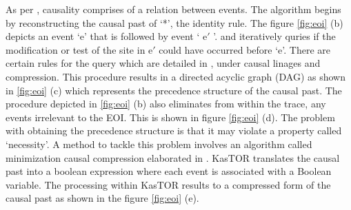 \documentclass[msc,deptreport,ai]{infthesis}      %
\begin{document}
As per \cite{kappaPlatform}, causality comprises of a relation between events. The algorithm begins by reconstructing the causal past of `*', the identity rule. The figure \ref{fig:eoi} (b) depicts an event `e' that is followed by event ` e$'$ '. and iteratively quries if the modification or test of the site in e$'$  could have occurred before `e'. There are certain rules for the query which are detailed in \cite{kappaPlatform}, under causal linages and compression. This procedure results in a directed acyclic graph (DAG) as shown in \ref{fig:eoi} (c) which represents the precedence structure of the causal past. The procedure depicted in \ref{fig:eoi} (b) also eliminates from within the trace, any events irrelevant to the EOI. This is shown in figure \ref{fig:eoi} (d). The problem with obtaining the precedence structure is that it may violate a property called `necessity'. A method to tackle this problem involves an algorithm called minimization causal compression elaborated in \cite{danos2012graphs}. KasTOR translates the causal past into a boolean expression where each event is associated with a Boolean variable. The processing within KasTOR results to a compressed form of the causal past as shown in the figure \ref{fig:eoi} (e).
\end{document}
